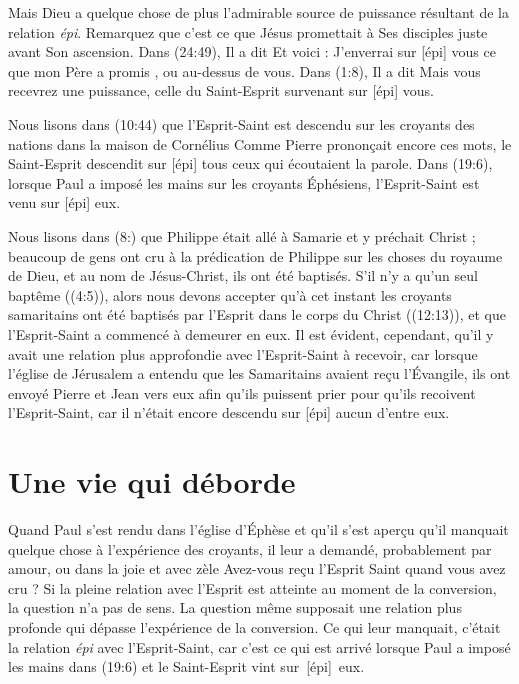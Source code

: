 Mais Dieu a quelque chose de plus \ocadr l'admirable source de puissance
 résultant de la relation \emph{épi}.
 Remarquez que c'est ce que Jésus promettait à Ses disciples juste avant
 Son ascension. Dans (24:49), Il a dit\frcolon{}
 \Og Et voici : J'enverrai sur [épi] vous ce que mon Père a promis \Fg{},
 ou \Og au-dessus de vous. \Fg{}
 Dans (1:8), Il a dit\frcolon{}
 \Og Mais vous recevrez une puissance, celle du Saint-Esprit survenant
 sur [épi] vous. \Fg{}

Nous lisons dans (10:44) que l'Esprit-Saint est descendu
 \Og sur \Fg{} les croyants des nations dans la maison de Cornélius\frcolon{}
 \Og Com\-me Pierre prononçait encore ces mots, le Saint-Esprit descendit
 sur [épi] tous ceux qui écoutaient la parole. \Fg{}
 Dans (19:6), lorsque Paul a imposé les mains sur les
 croyants Éphésiens, l'Esprit-Saint est venu sur [épi] eux.

Nous lisons dans (8:) que Philippe était allé à Samarie
 et y préchait Christ ; beaucoup de gens ont cru à la prédication de Philippe
 sur les choses du royaume de Dieu, et au nom de Jésus-Christ,
 ils ont été baptisés.
 S'il n'y a qu'un seul baptême ((4:5)),
 alors nous devons accepter qu'à cet instant les croyants samaritains
 ont été baptisés par l'Esprit dans le corps du Christ
 ((12:13)), et que l'Esprit-Saint a commencé à demeurer
 en eux. Il est évident, cependant, qu'il y avait une relation plus approfondie
 avec l'Esprit-Saint à recevoir, car lorsque l'église de Jérusalem a entendu
 que les Samaritains avaient reçu l'Évangile, ils ont envoyé Pierre et Jean
 vers eux afin qu'ils puissent prier pour qu'ils recoivent l'Esprit-Saint,
 car il n'était encore descendu sur [épi] aucun d'entre eux.

\section{Une vie qui d\'eborde}

Quand Paul s'est rendu dans l'église d'Éphèse et qu'il s'est aperçu
 qu'il manquait quelque chose à l'expérience des croyants, 
 il leur a demandé,
 probablement par amour, ou dans la joie et avec zèle\frcolon{}
 \Og Avez-vous reçu l'Esprit Saint quand vous avez cru ? \Fg{}
 Si la pleine relation avec l'Esprit est atteinte au moment de
 la conversion, la question n'a pas de sens.
 La question même supposait une relation plus profonde qui dépasse
 l'expérience  de la conversion.
 Ce qui leur manquait, c'était la relation
 \emph{épi} avec l'Es\-prit-Saint, car c'est ce qui
 est arrivé lorsque Paul a imposé les mains dans (19:6)\frcolon{}
 \Og et le Saint-Esprit vint sur~[épi]~eux. \Fg{}

